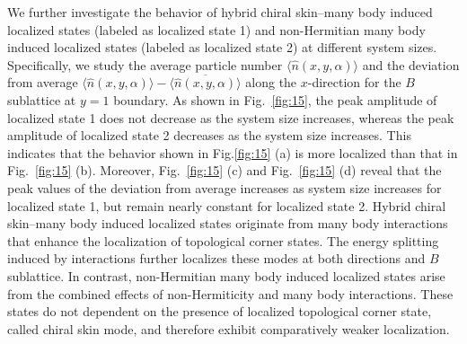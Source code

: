 \documentclass[longbibliography, aps, prx, amsmath, amssymb, amsfonts, twocolumn,superscriptaddress, footinbib]{revtex4-1}
\begin{document}
	We further investigate the behavior of hybrid chiral skin–many body induced localized states (labeled as localized state 1) and non-Hermitian many body induced localized states (labeled as localized state 2) at different system sizes. Specifically, we study the average particle number $\langle \hat{n}(x, y, \alpha) \rangle$ and the deviation from average $\langle \hat{n}(x, y, \alpha) \rangle - \overline{\langle \hat{n}(x, y, \alpha) \rangle}$ along the $x$-direction for the $B$ sublattice at $y = 1$ boundary.
	As shown in Fig.~\ref{fig:15}, the peak amplitude of localized state 1 does not decrease as the system size increases, whereas the peak amplitude of localized state 2 decreases as the system size increases. This indicates that the behavior shown in Fig.\ref{fig:15} (a) is more localized than that in Fig.~\ref{fig:15} (b).
	Moreover, Fig.~\ref{fig:15} (c) and Fig.~\ref{fig:15} (d) reveal that the peak values of the deviation from average increases as system size increases for localized state 1, but remain nearly constant for localized state 2.
	Hybrid chiral skin–many body induced localized states originate from many body interactions that enhance the localization of topological corner states. 
	The energy splitting induced by interactions further localizes these modes at both directions and $B$ sublattice. 
	In contrast, non-Hermitian many body induced localized states arise from the combined effects of non-Hermiticity and many body interactions. These states do not dependent on the presence of localized topological corner state, called chiral skin mode, and therefore exhibit comparatively weaker localization.
\end{document}
